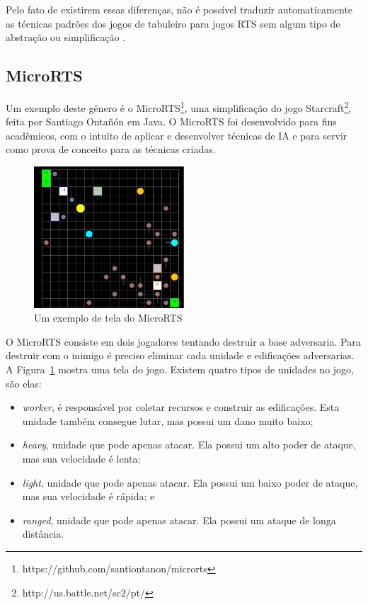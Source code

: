 Pelo fato de existirem essas diferenças, não é possível traduzir automaticamente as técnicas padrões dos jogos de tabuleiro para jogos RTS sem algum tipo de abstração ou simplificação \cite{ontanon2013survey}.

\subsection{MicroRTS}  

Um exemplo deste gênero é o MicroRTS\footnote{https://github.com/santiontanon/microrts}, uma simplificação do jogo Starcraft\footnote{http://us.battle.net/sc2/pt/}, feita por Santiago Ontañón \cite{ontanon2013combinatorial} em Java. O MicroRTS foi desenvolvido para fins acadêmicos, com o intuito de aplicar e desenvolver técnicas de IA e para servir como prova de conceito para as técnicas criadas.

\begin{figure}[ht]
	\centering
	\includegraphics[width=0.5\textwidth]{fig/microrts.pdf}
	\caption{Um exemplo de tela do MicroRTS}
	\label{fig:microrts}
\end{figure} 

O MicroRTS consiste em dois jogadores tentando destruir a base adversaria. Para destruir com o inimigo é preciso eliminar cada unidade e edificações adversarias. A Figura~\ref{fig:microrts} mostra uma tela do jogo. Existem quatro tipos de unidades no jogo, são elas:

\begin{itemize}
	\item \textit{worker}, é responsável por coletar recursos e construir as edificações. Esta unidade também consegue lutar, mas possui um dano muito baixo;
	\item \textit{heavy}, unidade que pode apenas atacar. Ela possui um alto poder de ataque, mas sua velocidade é lenta;
	\item \textit{light}, unidade que pode apenas atacar. Ela possui um baixo poder de ataque, mas sua velocidade é rápida; e
	\item \textit{ranged}, unidade que pode apenas atacar. Ela possui um ataque de longa distância. 
\end{itemize} 

